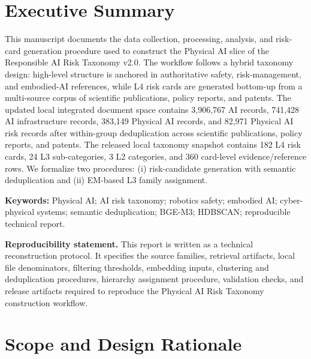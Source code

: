 \documentclass[11pt]{article}
\begin{document}
\section*{Executive Summary}
This manuscript documents the data collection, processing, analysis, and risk-card generation procedure used to construct the Physical AI slice of the Responsible AI Risk Taxonomy v2.0. The workflow follows a hybrid taxonomy design: high-level structure is anchored in authoritative safety, risk-management, and embodied-AI references, while L4 risk cards are generated bottom-up from a multi-source corpus of scientific publications, policy reports, and patents. The updated local integrated document space contains 3,906,767 AI records, 741,428 AI infrastructure records, 383,149 Physical AI records, and 82,971 Physical AI risk records after within-group deduplication across scientific publications, policy reports, and patents. The released local taxonomy snapshot contains 182 L4 risk cards, 24 L3 sub-categories, 3 L2 categories, and 360 card-level evidence/reference rows. We formalize two procedures: (i) risk-candidate generation with semantic deduplication and (ii) EM-based L3 family assignment.

\textbf{Keywords:} Physical AI; AI risk taxonomy; robotics safety; embodied AI; cyber-physical systems; semantic deduplication; BGE-M3; HDBSCAN; reproducible technical report.

\textbf{Reproducibility statement.} This report is written as a technical reconstruction protocol. It specifies the source families, retrieval artifacts, local file denominators, filtering thresholds, embedding inputs, clustering and deduplication procedures, hierarchy assignment procedure, validation checks, and release artifacts required to reproduce the Physical AI Risk Taxonomy construction workflow.

\tableofcontents
\newpage

\section{Scope and Design Rationale}
\end{document}
